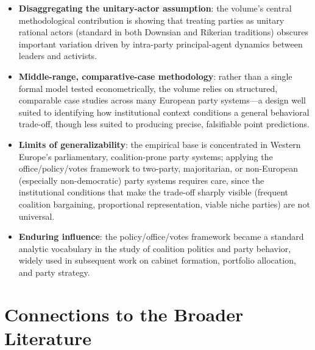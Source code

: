 \documentclass[12pt]{article}
\begin{document}
\begin{itemize}[leftmargin=*, itemsep=4pt]
    \item \textbf{Disaggregating the unitary-actor assumption}: the volume's central methodological contribution is showing that treating parties as unitary rational actors (standard in both Downsian and Rikerian traditions) obscures important variation driven by intra-party principal-agent dynamics between leaders and activists.
    \item \textbf{Middle-range, comparative-case methodology}: rather than a single formal model tested econometrically, the volume relies on structured, comparable case studies across many European party systems---a design well suited to identifying how institutional context conditions a general behavioral trade-off, though less suited to producing precise, falsifiable point predictions.
    \item \textbf{Limits of generalizability}: the empirical base is concentrated in Western Europe's parliamentary, coalition-prone party systems; applying the office/policy/votes framework to two-party, majoritarian, or non-European (especially non-democratic) party systems requires care, since the institutional conditions that make the trade-off sharply visible (frequent coalition bargaining, proportional representation, viable niche parties) are not universal.
    \item \textbf{Enduring influence}: the policy/office/votes framework became a standard analytic vocabulary in the study of coalition politics and party behavior, widely used in subsequent work on cabinet formation, portfolio allocation, and party strategy.
\end{itemize}

\section{Connections to the Broader Literature}
\end{document}
